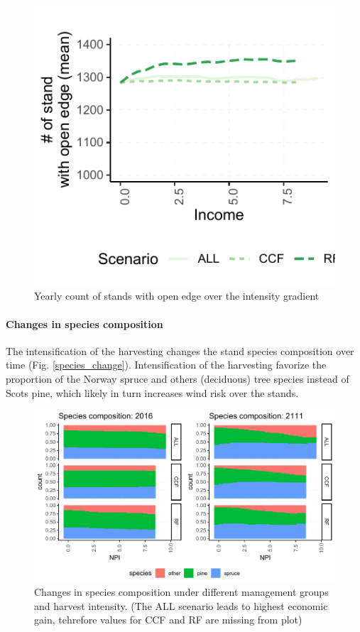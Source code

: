 \documentclass[]{elsarticle} %
\makeatletter
\def\maxwidth{\ifdim\Gin@nat@width>\linewidth\linewidth
\else\Gin@nat@width\fi}
\let\Oldincludegraphics\includegraphics
\renewcommand{\includegraphics}[1]{\Oldincludegraphics[width=\maxwidth]{#1}}
\makeatother
\begin{document}
\begin{figure}
\centering
\includegraphics{test_manus_files/figure-latex/fig_6_count_open_edge-1.pdf}
\caption{Yearly count of stands with open edge over the intensity
gradient}
\end{figure}

\paragraph{Changes in species
composition}\label{changes-in-species-composition}

The intensification of the harvesting changes the stand species
composition over time (Fig. \ref{species_change}). Intensification of
the harvesting favorize the proportion of the Norway spruce and others
(deciduous) tree species instead of Scots pine, which likely in turn
increases wind risk over the stands.

\begin{figure}
\centering
\includegraphics{test_manus_files/figure-latex/species_change-1.pdf}
\caption{Changes in species composition under different management
groups and harvest intensity. (The ALL scenario leads to highest
economic gain, tehrefore values for CCF and RF are missing from plot)}
\end{figure}
\end{document}
